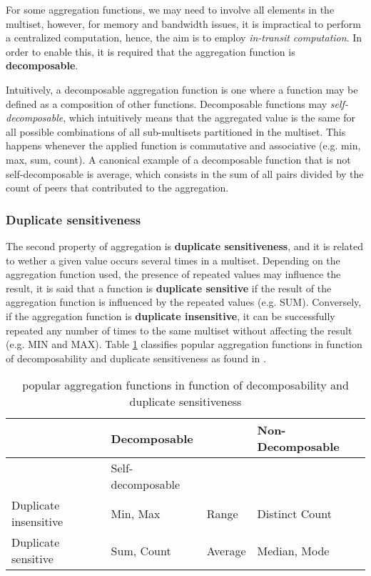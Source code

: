 For some aggregation functions, we may need to involve all elements in the multiset, however, for memory and bandwidth issues, it is impractical to perform a centralized computation, hence, the aim is to employ \textit{in-transit computation}. In order to enable this, it is required that the aggregation function is \textbf{decomposable}. 

Intuitively, a decomposable aggregation function is one where a function may be defined as a composition of other functions. Decomposable functions may \textit{self-decomposable}, which intuitively means that the aggregated value is the same for all possible combinations of all sub-multisets partitioned in the multiset. This happens whenever the applied function is commutative and associative (e.g. min, max, sum, count). A canonical example of a decomposable function that is not self-decomposable is average, which consists in the sum of all pairs divided by the count of peers that contributed to the aggregation.

\subsubsection*{Duplicate sensitiveness}

The second property of aggregation is \textbf{duplicate sensitiveness}, and it is related to wether a given value occurs several times in a multiset. Depending on the aggregation function used, the presence of repeated values may influence the result, it is said that a function is \textbf{duplicate sensitive} if the result of the aggregation function is influenced by the repeated values (e.g. SUM). Conversely, if the aggregation function is \textbf{duplicate insensitive}, it can be successfully repeated any number of times to the same multiset without affecting the result (e.g. MIN and MAX). Table \ref{table:aggregation_functions} classifies popular aggregation functions in function of decomposability and duplicate sensitiveness as found in \cite{DBLP:journals/corr/abs-1110-0725}.

\begin{table}[]
    \begin{tabular}{|l|l|l|l|}
    \hline
                          & \multicolumn{2}{l|}{Decomposable} & Non-Decomposable  \\ \hline
                          & Self-decomposable    &                             &  \\ \hline
    Duplicate insensitive & Min, Max             & Range     & Distinct Count    \\ \hline
    Duplicate sensitive   & Sum, Count           & Average   & Median, Mode     \\ \hline
    \end{tabular}
    \caption{popular aggregation functions in function of decomposability and duplicate sensitiveness}
    \label{table:aggregation_functions}
\end{table}

